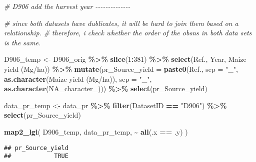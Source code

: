 \documentclass[
]{article}
\newenvironment{Shaded}{\begin{snugshade}}{\end{snugshade}}
\newcommand{\AttributeTok}[1]{\textcolor[rgb]{0.13,0.29,0.53}{#1}}
\newcommand{\CommentTok}[1]{\textcolor[rgb]{0.56,0.35,0.01}{\textit{#1}}}
\newcommand{\ConstantTok}[1]{\textcolor[rgb]{0.56,0.35,0.01}{#1}}
\newcommand{\DecValTok}[1]{\textcolor[rgb]{0.00,0.00,0.81}{#1}}
\newcommand{\FunctionTok}[1]{\textcolor[rgb]{0.13,0.29,0.53}{\textbf{#1}}}
\newcommand{\NormalTok}[1]{#1}
\newcommand{\OtherTok}[1]{\textcolor[rgb]{0.56,0.35,0.01}{#1}}
\newcommand{\SpecialCharTok}[1]{\textcolor[rgb]{0.81,0.36,0.00}{\textbf{#1}}}
\newcommand{\StringTok}[1]{\textcolor[rgb]{0.31,0.60,0.02}{#1}}
\begin{document}
\begin{Shaded}
\begin{Highlighting}[]
\CommentTok{\# D906 add the harvest year {-}{-}{-}{-}{-}{-}{-}{-}{-}{-}{-}{-}{-}{-}}

\CommentTok{\# since both datasets have dublicates, it will be hard to join them based on a relationship. }
\CommentTok{\# therefore, i check whether the order of the obsns in both data sets is the same. }

\NormalTok{D906\_temp }\OtherTok{\textless{}{-}} 
\NormalTok{  D906\_orig }\SpecialCharTok{\%\textgreater{}\%}
  \FunctionTok{slice}\NormalTok{(}\DecValTok{1}\SpecialCharTok{:}\DecValTok{381}\NormalTok{) }\SpecialCharTok{\%\textgreater{}\%}   
  \FunctionTok{select}\NormalTok{(Ref., Year, }\StringTok{\textasciigrave{}}\AttributeTok{Maize yield (Mg/ha)}\StringTok{\textasciigrave{}}\NormalTok{) }\SpecialCharTok{\%\textgreater{}\%} 
  \FunctionTok{mutate}\NormalTok{(}\AttributeTok{pr\_Source\_yield =} \FunctionTok{paste0}\NormalTok{(Ref., }\AttributeTok{sep =} \StringTok{"\_"}\NormalTok{, }\FunctionTok{as.character}\NormalTok{(}\StringTok{\textasciigrave{}}\AttributeTok{Maize yield (Mg/ha)}\StringTok{\textasciigrave{}}\NormalTok{), }\AttributeTok{sep =} \StringTok{"\_"}\NormalTok{, }\FunctionTok{as.character}\NormalTok{(}\ConstantTok{NA\_character\_}\NormalTok{))) }\SpecialCharTok{\%\textgreater{}\%} 
  \FunctionTok{select}\NormalTok{(pr\_Source\_yield)}

\NormalTok{data\_pr\_temp }\OtherTok{\textless{}{-}} 
\NormalTok{data\_pr }\SpecialCharTok{\%\textgreater{}\%} 
  \FunctionTok{filter}\NormalTok{(DatasetID }\SpecialCharTok{==} \StringTok{"D906"}\NormalTok{) }\SpecialCharTok{\%\textgreater{}\%} 
  \FunctionTok{select}\NormalTok{(pr\_Source\_yield) }

\FunctionTok{map2\_lgl}\NormalTok{(}
\NormalTok{  D906\_temp, data\_pr\_temp, }
  \SpecialCharTok{\textasciitilde{}} \FunctionTok{all}\NormalTok{(.x }\SpecialCharTok{==}\NormalTok{ .y)}
\NormalTok{)}
\end{Highlighting}
\end{Shaded}

\begin{verbatim}
## pr_Source_yield 
##            TRUE
\end{verbatim}
\end{document}

